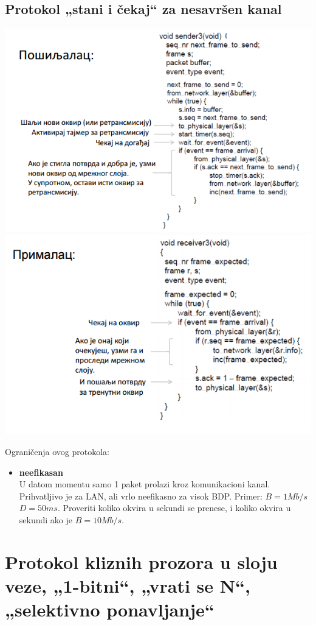 \documentclass{article} %
\begin{document}
\subsection{Protokol „stani i čekaj“ za nesavršen kanal}
\begin{center}
	\includegraphics[scale=0.5]{staniIcekaj2}
	\includegraphics[scale=0.5]{staniIcekaj3}
\end{center}
Ograničenja ovog protokola: 
\begin{itemize}
  \item \textbf{neefikasan}\\
  U datom momentu samo 1 paket prolazi kroz komunikacioni kanal. Prihvatljivo je za LAN, ali vrlo neefikasno za visok BDP. Primer: $B = 1 Mb/s$ $ D=50ms $. Proveriti koliko okvira u sekundi se prenese, i koliko okvira   u sekundi ako je $B = 10 Mb/s$.
\end{itemize}
\section{Protokol kliznih prozora u sloju veze, „1-bitni“, „vrati se N“, „selektivno ponavljanje“}
\end{document}
